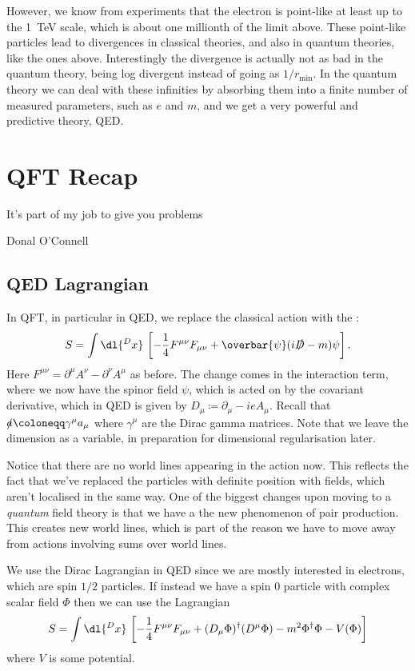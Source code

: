 \documentclass[fleqn]{NotesClass}
\newcommand{\diracadjoint}[1]{\overbar{#1}}
\newcommand{\covariantDerivative}{D}
\newcommand{\hermit}{\dagger}
\begin{document}
    However, we know from experiments that the electron is point-like at least up to the \qty{1}{\tera\electronvolt} scale, which is about one millionth of the limit above.
    These point-like particles lead to divergences in classical theories, and also in quantum theories, like the ones above.
    Interestingly the divergence is actually not as bad in the quantum theory, being log divergent instead of going as \(1/r_{\min}\).
    In the quantum theory we can deal with these infinities by absorbing them into a finite number of measured parameters, such as \(e\) and \(m\), and we get a very powerful and predictive theory, QED.
    
    \chapter{QFT Recap}
    \epigraph{It's part of my job to give you problems}{Donal O'Connell}
    \section{QED Lagrangian}
    In QFT, in particular in QED, we replace the classical action with the :
    \begin{equation}
        S = \int \dl{^Dx} \, \left[ -\frac{1}{4}F^{\mu\nu}F_{\mu\nu} + \diracadjoint{\psi} (i\slashed{\covariantDerivative} - m)\psi \right].
    \end{equation}
    Here \(F^{\mu\nu} = \partial^\mu A^\nu - \partial^\nu A^\mu\) as before.
    The change comes in the interaction term, where we now have the spinor field \(\psi\), which is acted on by the covariant derivative, which in QED is given by \(\covariantDerivative_\mu \coloneqq \partial_\mu -ieA_\mu\).
    Recall that \(\slashed{a} \coloneqq \gamma^\mu a_\mu\) where \(\gamma^\mu\) are the Dirac gamma matrices.
    Note that we leave the dimension as a variable, in preparation for dimensional regularisation later.
    
    Notice that there are no world lines appearing in the action now.
    This reflects the fact that we've replaced the particles with definite position with fields, which aren't localised in the same way.
    One of the biggest changes upon moving to a \emph{quantum} field theory is that we have a the new phenomenon of pair production.
    This creates new world lines, which is part of the reason we have to move away from actions involving sums over world lines.
    
    We use the Dirac Lagrangian in QED since we are mostly interested in electrons, which are spin \(1/2\) particles.
    If instead we have a spin 0 particle with complex scalar field \(\Phi\) then we can use the  Lagrangian
    \begin{equation}
        S = \int \dl{^Dx} \, \left[ -\frac{1}{4}F^{\mu\nu}F_{\mu\nu} + (\covariantDerivative_\mu \Phi)^\hermit (\covariantDerivative^\mu \Phi) - m^2 \Phi^\hermit \Phi - V(\Phi) \right]
    \end{equation}
    where \(V\) is some potential.
    
\end{document}
